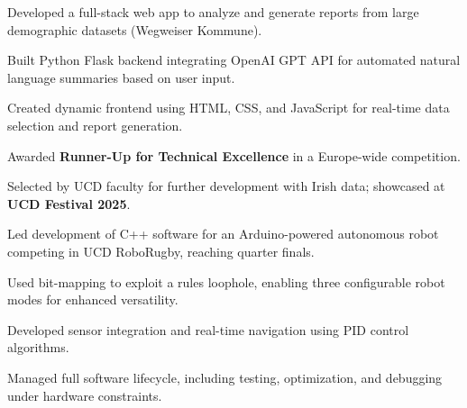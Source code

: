 
\medskip
\begin{cvitems}
  \item Developed a full-stack web app to analyze and generate reports from large demographic datasets (Wegweiser Kommune).
  \item Built Python Flask backend integrating OpenAI GPT API for automated natural language summaries based on user input.
  \item Created dynamic frontend using HTML, CSS, and JavaScript for real-time data selection and report generation.
  \item Awarded \textbf{Runner-Up for Technical Excellence} in a Europe-wide competition.
  \item Selected by UCD faculty for further development with Irish data; showcased at \textbf{UCD Festival 2025}.
\end{cvitems}

\bigskip

\medskip
\begin{cvitems}
  \item Led development of C++ software for an Arduino-powered autonomous robot competing in UCD RoboRugby, reaching quarter finals.
  \item Used bit-mapping to exploit a rules loophole, enabling three configurable robot modes for enhanced versatility.
  \item Developed sensor integration and real-time navigation using PID control algorithms.
  \item Managed full software lifecycle, including testing, optimization, and debugging under hardware constraints.
\end{cvitems}
